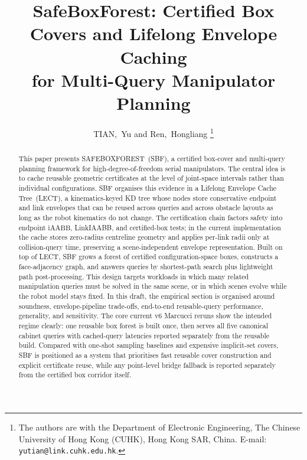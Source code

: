 \documentclass[journal]{IEEEtran}
\DeclareRobustCommand{\textsc}[1]{\textnormal{\MakeUppercase{#1}}}
\newcommand{\iAABB}{\ensuremath{\mathrm{iAABB}}}
\begin{document}
\title{SafeBoxForest: Certified Box Covers and Lifelong Envelope Caching\\
for Multi-Query Manipulator Planning}

\author{TIAN,~Yu and Ren,~Hongliang%
\thanks{The authors are with the Department of Electronic Engineering,
The Chinese University of Hong Kong (CUHK), Hong Kong SAR, China.
E-mail: \texttt{yutian@link.cuhk.edu.hk}.}}

\maketitle

\begin{abstract}
This paper presents \textsc{SafeBoxForest}~(SBF), a certified box-cover and
multi-query planning framework for high-degree-of-freedom serial manipulators.
The central idea is to cache reusable geometric certificates at the level of
joint-space intervals rather than individual configurations. SBF organises this
evidence in a Lifelong Envelope Cache Tree~(LECT), a kinematics-keyed KD tree
whose nodes store conservative endpoint and link envelopes that can be reused
across queries and across obstacle layouts as long as the robot kinematics do
not change. The certification chain factors safety into endpoint \iAABB,
LinkIAABB, and certified-box tests; in the current implementation the cache stores
zero-radius centreline geometry and applies per-link radii only at
collision-query time, preserving a scene-independent envelope representation.
Built on top of LECT, SBF grows a forest of certified configuration-space
boxes, constructs a face-adjacency graph, and answers queries by shortest-path
search plus lightweight path post-processing. This design targets workloads in
which many related manipulation queries must be solved in the same scene, or in
which scenes evolve while the robot model stays fixed. In this draft, the
empirical section is organised around soundness, envelope-pipeline trade-offs,
end-to-end reusable-query performance, generality, and sensitivity. The core
current v6 Marcucci reruns show the intended regime clearly: one reusable box
forest is built once, then serves all five canonical cabinet queries with
cached-query latencies reported separately from the reusable build. Compared
with one-shot sampling baselines and expensive implicit-set covers, SBF is
positioned as a system that prioritises fast reusable cover construction and
explicit certificate reuse, while any point-level bridge fallback is reported
separately from the certified box corridor itself.
\end{abstract}
\end{document}
